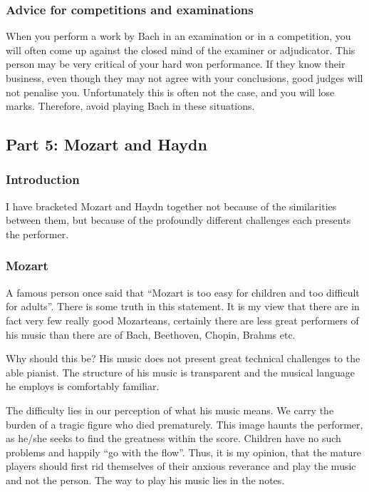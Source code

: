 \documentclass{article}
\begin{document}
\subsubsection{Advice for competitions and examinations}

When you perform a work by Bach in an examination or in a competition, you will often come up against the closed mind of the examiner or adjudicator.
This person may be very critical of your hard won performance.
If they know their business, even though they may not agree with your conclusions, good judges will not penalise you.
Unfortunately this is often not the case, and you will lose marks.
Therefore, avoid playing Bach in these situations.

\subsection{Part 5: Mozart and Haydn}

\subsubsection{Introduction}

I have bracketed Mozart and Haydn together not because of the similarities between them, but because of the profoundly different challenges each presents the performer.

\subsubsection{Mozart}

A famous person once said that ``Mozart is too easy for children and too difficult for adults''.
There is some truth in this statement.
It is my view that there are in fact very few really good Mozarteans, certainly there are less great performers of his music than there are of Bach, Beethoven, Chopin, Brahms etc.

Why should this be?
His music does not present great technical challenges to the able pianist.
The structure of his music is transparent and the musical language he employs is comfortably familiar.

The difficulty lies in our perception of what his music means.
We carry the burden of a tragic figure who died prematurely.
This image haunts the performer, as he/she seeks to find the greatness within the score.
Children have no such problems and happily ``go with the flow''.
Thus, it is my opinion, that the mature players should first rid themselves of their anxious reverance and play the music and not the person.
The way to play his music lies in the notes.
\end{document}
